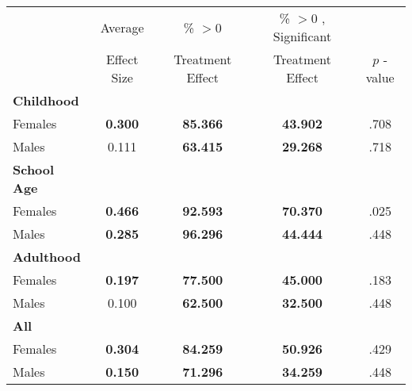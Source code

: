 \begin{tabular}{l c c c c}
\toprule
 & Average & \% $ >0 $ & \% $ >0 $ , Significant & \citet{Rosenbaum_2005_Distribution_JRSS} \\
 & Effect Size & Treatment Effect & Treatment Effect & $ p $ -value \\
\midrule
\textbf{Childhood} & & & & \\
\quad Females &  \textbf{    0.300} & \textbf{   85.366} & \textbf{   43.902} & .708 \\
\quad Males &      0.111 & \textbf{   63.415} & \textbf{   29.268} & .718 \\
\midrule
\textbf{School Age} & & & & \\
\quad Females &  \textbf{    0.466} & \textbf{   92.593} & \textbf{   70.370} & .025 \\
\quad Males &  \textbf{    0.285} & \textbf{   96.296} & \textbf{   44.444} & .448 \\
\midrule
\textbf{Adulthood} & & & & \\
\quad Females &  \textbf{    0.197} & \textbf{   77.500} & \textbf{   45.000} & .183 \\
\quad Males &      0.100 & \textbf{   62.500} & \textbf{   32.500} & .448 \\
\midrule
\textbf{All} & & & & \\
\quad Females &  \textbf{    0.304} & \textbf{   84.259} & \textbf{   50.926} & .429 \\
\quad Males &  \textbf{    0.150} & \textbf{   71.296} & \textbf{   34.259} & .448 \\
\bottomrule
\end{tabular}
